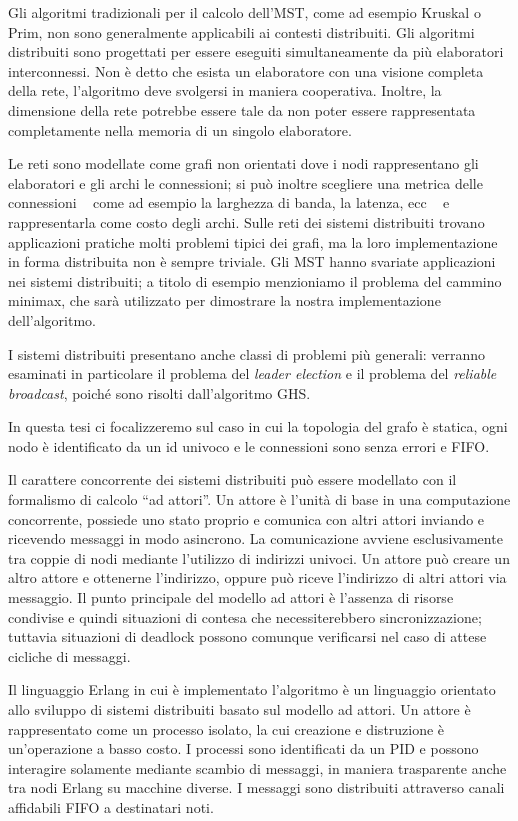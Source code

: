 \documentclass[target=bach,aauheader=,style=]{thud}
\newcommand{\eng}[1]{\foreignlanguage{english}{#1}}
\begin{document}
Gli algoritmi tradizionali per il calcolo dell'MST, come ad esempio Kruskal o Prim, non sono generalmente applicabili ai contesti distribuiti. Gli algoritmi distribuiti sono progettati per essere eseguiti simultaneamente da più elaboratori interconnessi. Non è detto che esista un elaboratore con una visione completa della rete, l'algoritmo deve svolgersi in maniera cooperativa. Inoltre, la dimensione della rete potrebbe essere tale da non poter essere rappresentata completamente nella memoria di un singolo elaboratore.

Le reti sono modellate come grafi non orientati dove i nodi rappresentano gli elaboratori e gli archi le connessioni; si può inoltre scegliere una metrica delle connessioni \,\textendash\,~come ad esempio la larghezza di banda, la latenza, ecc~\,\textendash\, e rappresentarla come costo degli archi. Sulle reti dei sistemi distribuiti trovano applicazioni pratiche molti problemi tipici dei grafi, ma la loro implementazione in forma distribuita non è sempre triviale. Gli MST hanno svariate applicazioni nei sistemi distribuiti; a titolo di esempio menzioniamo il problema del cammino minimax, che sarà utilizzato per dimostrare la nostra implementazione dell'algoritmo.

I sistemi distribuiti presentano anche classi di problemi più generali: verranno esaminati in particolare il problema del \emph{\eng{leader election}} e il problema del \emph{\eng{reliable broadcast}}, poiché sono risolti dall'algoritmo GHS.

In questa tesi ci focalizzeremo sul caso in cui la topologia del grafo è statica, ogni nodo è identificato da un id univoco e le connessioni sono senza errori e FIFO.
\bigskip

Il carattere concorrente dei sistemi distribuiti può essere modellato con il formalismo di calcolo ``ad attori''. Un attore è l'unità di base in una computazione concorrente, possiede uno stato proprio e comunica con altri attori inviando e ricevendo messaggi in modo asincrono. La comunicazione avviene esclusivamente tra coppie di nodi mediante l'utilizzo di indirizzi univoci. Un attore può creare un altro attore e ottenerne l'indirizzo, oppure può riceve l'indirizzo di altri attori via messaggio.  Il punto principale del modello ad attori è l'assenza di risorse condivise e quindi situazioni di contesa che necessiterebbero sincronizzazione; tuttavia situazioni di \eng{deadlock} possono comunque verificarsi nel caso di attese cicliche di messaggi.

Il linguaggio Erlang in cui è implementato l'algoritmo è un linguaggio orientato allo sviluppo di sistemi distribuiti basato sul modello ad attori. Un attore è rappresentato come un processo isolato, la cui creazione e distruzione è un'operazione a basso costo. I processi sono identificati da un PID e possono interagire solamente mediante scambio di messaggi, in maniera trasparente anche tra nodi Erlang su macchine diverse. I messaggi sono distribuiti attraverso canali affidabili FIFO a destinatari noti.
\bigskip
\end{document}
